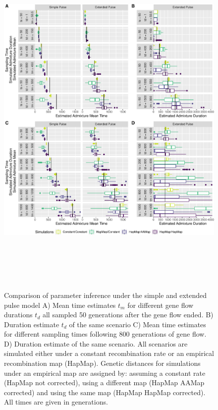 \documentclass[11pt]{article}
\begin{document}
\begin{figure}
\centering
\includegraphics[width=16cm,height=18cm,keepaspectratio]{ATE_Revisions_files/figure-latex/figCloser_Sampling_Supplement-1.pdf}
\caption{\label{fig:Closer_sampling} Comparison of parameter inference under the simple and extended pulse model  A) Mean time estimates $t_m$ for different gene
flow durations $t_d$ all sampled 50 generations after the gene flow ended. B)
Duration estimate $t_d$ of the same scenario C) Mean time estimates for different sampling times following 800
generations of gene flow. D) Duration estimate of the same scenario. All scenarios are simulated either under a constant recombination rate or an empirical recombination map (HapMap). Genetic distances for simulations under an empirical map are assigned by: assuming a constant rate (HapMap not corrected), using a different map (HapMap AAMap corrected) and using the same map (HapMap HapMap corrected). All times are given in generations.}
\end{figure}
\end{document}
